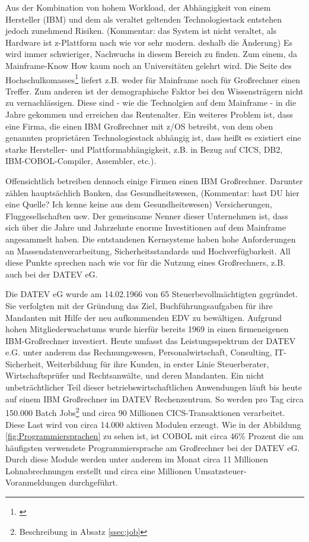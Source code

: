 Aus der Kombination von hohem Workload, der Abhängigkeit von einem Hersteller (IBM) und dem als veraltet geltenden Technologiestack entstehen jedoch zunehmend Risiken. (Kommentar: das System ist nicht veraltet, als Hardware ist z-Plattform nach wie vor sehr modern. deshalb die Änderung)
Es wird immer schwieriger, Nachwuchs in diesem Bereich zu finden.
Zum einem, da Mainframe-Know How kaum noch an Universitäten gelehrt wird.
Die Seite des Hochschulkomasses\footnote{\cite{internetagenturKolnFrankfurtsunzinetTYPO3Programmmierung.}} liefert z.B. weder für \glqq Mainframe\grqq{} noch für \glqq Großrechner\grqq{} einen Treffer.
Zum anderen ist der demographische Faktor bei den Wissensträgern nicht zu vernachlässigen. Diese sind - wie die Technolgien auf dem Mainframe - in die Jahre gekommen und erreichen das Rentenalter.
Ein weiteres Problem ist, dass eine Firma, die einen IBM Großrechner mit z/OS betreibt, von dem oben genannten proprietären Technologiestack abhängig ist, dass heißt es existiert eine starke Hersteller- und Plattformabhängigkeit, z.B. in Bezug auf CICS, DB2, IBM-COBOL-Compiler, Assembler, etc.).

Offensichtlich betreiben dennoch einige Firmen einen IBM Großrechner.
Darunter zählen hauptsächlich Banken, das Gesundheitswesen, (Kommentar: hast DU hier eine Quelle? Ich kenne keine aus dem Gesundheitswesen)  Versicherungen, Fluggesellschaften usw.
Der gemeinsame Nenner dieser Unternehmen ist, dass sich über die Jahre und Jahrzehnte enorme Investitionen auf dem Mainframe angesammelt haben.
Die entstandenen Kernsysteme haben hohe Anforderungen an Massendatenverarbeitung, Sicherheitsstandards und Hochverfügbarkeit.
All diese Punkte sprechen nach wie vor für die Nutzung eines Großrechners, z.B. auch bei der DATEV eG.
\cite{IBM.2014}

Die DATEV eG wurde am 14.02.1966 von 65 Steuerbevollmächtigten gegründet.
Sie verfolgten mit der Gründung das Ziel, Buchführungsaufgaben für ihre Mandanten mit Hilfe der neu aufkommenden EDV zu bewältigen.
Aufgrund hohen Mitgliederwachstums wurde hierfür bereits 1969 in einen firmeneigenen IBM-Großrechner investiert.\cite{DATEVeG.2017}
Heute umfasst das Leistungsspektrum der DATEV e.G. unter anderem das Rechnungswesen, Personalwirtschaft, Consulting, IT-Sicherheit, Weiterbildung für ihre Kunden, in erster Linie Steuerberater, Wirtschaftsprüfer und Rechtsanwälte, und deren Mandanten.
Ein nicht unbeträchtlicher Teil dieser betriebswirtschaftlichen Anwendungen läuft bis heute auf einem IBM Großrechner im DATEV Rechenzentrum.
So werden pro Tag circa 150.000 Batch Jobs\footnote{Beschreibung in Absatz \ref{ssec:job}} und circa 90 Millionen CICS-Transaktionen verarbeitet.
Diese Last wird von circa 14.000 aktiven Modulen erzeugt.
Wie in der Abbildung \ref{fig:Programmiersprachen} zu sehen ist, ist COBOL mit circa 46\% Prozent die am häufigsten verwendete Programmiersprache am Großrechner bei der DATEV eG.
Durch diese Module werden unter anderem im Monat circa 11 Millionen Lohnabrechnungen erstellt und circa eine Millionen Umsatzsteuer-Voranmeldungen durchgeführt.

